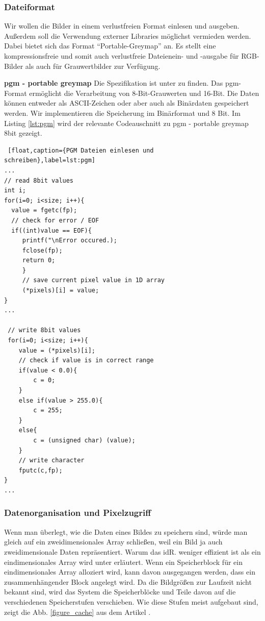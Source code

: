 \documentclass[a4paper,12pt]{article}
\begin{document}
\subsubsection{Dateiformat}
Wir wollen die Bilder in einem verlustfreien Format einlesen und ausgeben.
Außerdem soll die Verwendung externer Libraries möglichst vermieden werden.
Dabei bietet sich das  Format "`Portable-Greymap"' an. Es stellt eine
kompressionsfreie und somit auch verlustfreie Dateienein- und -ausgabe für
RGB-Bilder als auch für Grauwertbilder zur Verfügung.


\textbf{pgm - portable greymap}
Die Spezifikation ist unter \cite{pgm} zu finden.
Das pgm-Format ermöglicht die Verarbeitung von 8-Bit-Grauwerten und 16-Bit. 
Die Daten können entweder als ASCII-Zeichen oder aber auch als Binärdaten
gespeichert werden. Wir implementieren die Speicherung im Binärformat und 8 Bit.
Im Listing \ref{lst:pgm} wird der relevante Codeauschnitt zu pgm - portable greymap 8bit gezeigt.

\begin{lstlisting} [float,caption={PGM Dateien einlesen und
schreiben},label=lst:pgm] 
...
// read 8bit values
int i;
for(i=0; i<size; i++){
  value = fgetc(fp);
  // check for error / EOF
  if((int)value == EOF){
     printf("\nError occured.);
     fclose(fp);
     return 0;
     }
     // save current pixel value in 1D array
     (*pixels)[i] = value;
}
...

 // write 8bit values
 for(i=0; i<size; i++){
	value = (*pixels)[i];
	// check if value is in correct range
	if(value < 0.0){
		c = 0;
	}
	else if(value > 255.0){
		c = 255;
	}
	else{
		c = (unsigned char) (value);
	}
	// write character
	fputc(c,fp);
}
...
\end{lstlisting}

\subsubsection{Datenorganisation und Pixelzugriff}
Wenn man überlegt, wie die Daten eines Bildes zu speichern sind, würde man
gleich auf ein zweidimensionales Array schließen, weil ein Bild ja auch
zweidimensionale Daten repräsentiert. Warum das idR. weniger
effizient ist als ein eindimensionales Array wird unter \cite{fastcode}
erläutert. Wenn ein Speicherblock für ein eindimensionales Array alloziert wird,
kann davon ausgegangen werden, dass ein zusammenhängender Block angelegt wird.
Da die Bildgrößen zur Laufzeit nicht bekannt sind, wird das System die
Speicherblöcke und Teile davon auf die verschiedenen Speicherstufen verschieben.
Wie diese Stufen meist aufgebaut sind, zeigt die Abb. \ref{figure_cache} aus dem
Artikel \cite{fastcode}.
\end{document}
